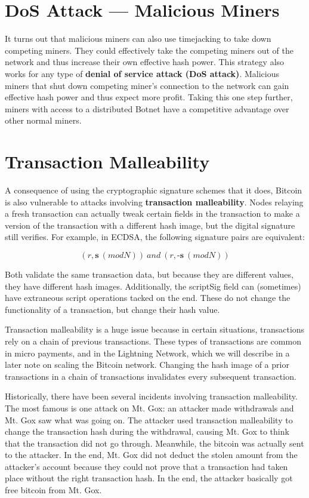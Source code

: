 \documentclass[full.tex]{subfiles}
\begin{document}
    \section*{DoS Attack --- Malicious Miners}
    
    It turns out that malicious miners can also use timejacking to take down competing miners. They could effectively take the competing miners out of the network and thus increase their own effective hash power. This strategy also works for any type of \textbf{denial of service attack (DoS attack)}. Malicious miners that shut down competing miner's connection to the network can gain effective hash power and thus expect more profit. Taking this one step further, miners with access to a distributed Botnet have a competitive advantage over other normal miners.
    
    \section*{Transaction Malleability}
    
    A consequence of using the cryptographic signature schemes that it does, Bitcoin is also vulnerable to attacks involving \textbf{transaction malleability}. Nodes relaying a fresh transaction can actually tweak certain fields in the transaction to make a version of the transaction with a different hash image, but the digital signature still verifies. For example, in ECDSA, the following signature pairs are equivalent:
    
    $$(r,\textbf{s}~(mod N)) ~and~ (r, \textbf{-s}~(mod N))$$
    
    Both validate the same transaction data, but because they are different values, they have different hash images. Additionally, the scriptSig field can (sometimes) have extraneous script operations tacked on the end. These do not change the functionality of a transaction, but change their hash value.
    
    Transaction malleability is a huge issue because in certain situations, transactions rely on a chain of previous transactions. These types of transactions are common in micro payments, and in the Lightning Network, which we will describe in a later note on scaling the Bitcoin network. Changing the hash image of a prior transactions in a chain of transactions invalidates every subsequent transaction.
    
    Historically, there have been several incidents involving transaction malleability. The most famous is one attack on Mt. Gox: an attacker made withdrawals and Mt. Gox saw what was going on. The attacker used transaction malleability to change the transaction hash during the withdrawal, causing Mt. Gox to think that the transaction did not go through. Meanwhile, the bitcoin was actually sent to the attacker. In the end, Mt. Gox did not deduct the stolen amount from the attacker's account because they could not prove that a transaction had taken place without the right transaction hash. In the end, the attacker basically got free bitcoin from Mt. Gox. 
    
\end{document}

